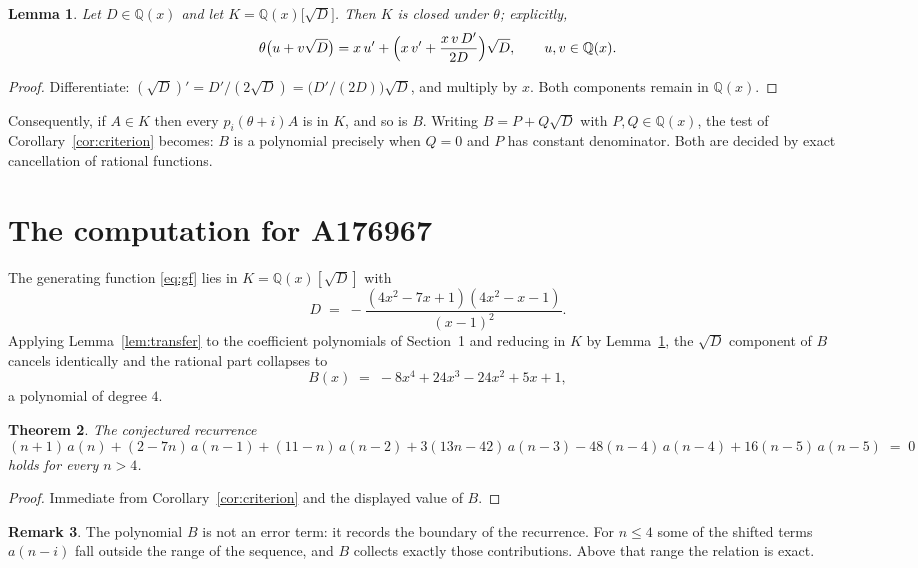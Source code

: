 \documentclass[11pt,a4paper]{article}
\theoremstyle{plain}
\newtheorem{theorem}{Theorem}
\newtheorem{lemma}[theorem]{Lemma}
\theoremstyle{definition}
\newtheorem{remark}[theorem]{Remark}
\begin{document}
\begin{lemma}\label{lem:field}
Let $D\in\mathbb{Q}(x)$ and let $K=\mathbb{Q}(x)\bigl[\sqrt{D}\bigr]$. Then $K$ is closed
under $\theta$; explicitly,
\[
\theta\bigl(u+v\sqrt{D}\bigr)=x\,u'+\Bigl(x\,v'+\frac{x\,v\,D'}{2D}\Bigr)\sqrt{D},
\qquad u,v\in\mathbb{Q}(x).
\]
\end{lemma}

\begin{proof}
Differentiate: $(\sqrt{D})'=D'/(2\sqrt{D})=\bigl(D'/(2D)\bigr)\sqrt{D}$, and multiply by
$x$. Both components remain in $\mathbb{Q}(x)$.
\end{proof}

Consequently, if $A\in K$ then every $p_{i}(\theta+i)A$ is in $K$, and so is $B$. Writing
$B=P+Q\sqrt{D}$ with $P,Q\in\mathbb{Q}(x)$, the test of Corollary~\ref{cor:criterion}
becomes: $B$ is a polynomial precisely when $Q=0$ and $P$ has constant denominator. Both
are decided by exact cancellation of rational functions.

\section{The computation for A176967}

The generating function \eqref{eq:gf} lies in $K=\mathbb{Q}(x)[\sqrt{D}]$ with
\[
D \;=\; - \frac{\left(4 x^{2} - 7 x + 1\right) \left(4 x^{2} - x - 1\right)}{\left(x - 1\right)^{2}} .
\]
Applying Lemma~\ref{lem:transfer} to the coefficient polynomials of Section~1 and reducing
in $K$ by Lemma~\ref{lem:field}, the $\sqrt{D}$ component of $B$ cancels identically and
the rational part collapses to
\[
B(x)\;=\;- 8 x^{4} + 24 x^{3} - 24 x^{2} + 5 x + 1 ,
\]
a polynomial of degree $4$.

\begin{theorem}
The conjectured recurrence
\[
(n + 1)\,a(n) + (2 - 7 n)\,a(n-1) + (11 - n)\,a(n-2) + 3 \left(13 n - 42\right)\,a(n-3) -  48 \left(n - 4\right)\,a(n-4) + 16 \left(n - 5\right)\,a(n-5) \;=\;0
\]
holds for every $n>4$.
\end{theorem}

\begin{proof}
Immediate from Corollary~\ref{cor:criterion} and the displayed value of $B$.
\end{proof}

\begin{remark}
The polynomial $B$ is not an error term: it records the boundary of the recurrence. For
$n\le4$ some of the shifted terms $a(n-i)$ fall outside the range of the sequence,
and $B$ collects exactly those contributions. Above that range the relation is exact.
\end{remark}
\end{document}
